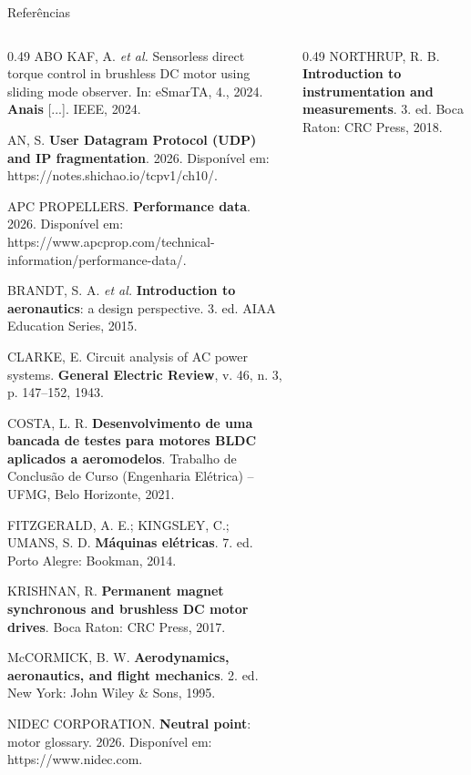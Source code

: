 \begin{frame}{Referências}
  \tiny
  \setlength{\parskip}{0.3em}
  \begin{columns}[t]
    \begin{column}{0.49\textwidth}\setlength{\parskip}{0.35em}
      ABO KAF, A. \textit{et al.} Sensorless direct torque control in
      brushless DC motor using sliding mode observer. In: eSmarTA, 4., 2024.
      \textbf{Anais} [...]. IEEE, 2024.

      AN, S. \textbf{User Datagram Protocol (UDP) and IP fragmentation}.
      2026. Disponível em: https://notes.shichao.io/tcpv1/ch10/.

      APC PROPELLERS. \textbf{Performance data}. 2026. Disponível em:
      https://www.apcprop.com/technical-information/performance-data/.

      BRANDT, S. A. \textit{et al.} \textbf{Introduction to aeronautics}:
      a design perspective. 3. ed. AIAA Education Series, 2015.

      CLARKE, E. Circuit analysis of AC power systems. \textbf{General
      Electric Review}, v. 46, n. 3, p. 147--152, 1943.

      COSTA, L. R. \textbf{Desenvolvimento de uma bancada de testes para
      motores BLDC aplicados a aeromodelos}. Trabalho de Conclusão de Curso
      (Engenharia Elétrica) -- UFMG, Belo Horizonte, 2021.

      FITZGERALD, A. E.; KINGSLEY, C.; UMANS, S. D. \textbf{Máquinas
      elétricas}. 7. ed. Porto Alegre: Bookman, 2014.

      KRISHNAN, R. \textbf{Permanent magnet synchronous and brushless DC
      motor drives}. Boca Raton: CRC Press, 2017.

      McCORMICK, B. W. \textbf{Aerodynamics, aeronautics, and flight
      mechanics}. 2. ed. New York: John Wiley \& Sons, 1995.

      NIDEC CORPORATION. \textbf{Neutral point}: motor glossary. 2026.
      Disponível em: https://www.nidec.com.
    \end{column}
    \begin{column}{0.49\textwidth}\setlength{\parskip}{0.35em}
      NORTHRUP, R. B. \textbf{Introduction to instrumentation and
      measurements}. 3. ed. Boca Raton: CRC Press, 2018.


\end{column}
\end{columns}
\end{frame}
